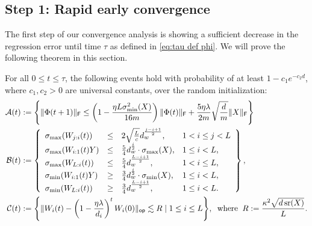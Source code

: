 \subsection{Step 1: Rapid early convergence}
\label{sec:subsec:Step 1: Rapid early convergence}
The first step of our convergence analysis is 
showing a sufficient decrease in the regression error until time $\tau$ as defined in \cref{eq:tau def phi}.
We will prove the following theorem in this section. 
\begin{theorem}
\label{thm:step1-induction}
    For all $0 \leq t \leq \tau$, the following events hold with probability of at least $1-c_1 e^{-c_2 d}$, where $c_1, c_2 > 0$ are
    universal constants, over the random initialization:
    \begin{subequations}
      \begin{align}
          \cA(t) &:= \set*{
              \frobnorm{\Phi(t+1)} \leq
              \left(1 - \frac{\eta L \sigma_{\min}^2(X)}{16 \din} \right)
              \frobnorm{\Phi(t)}
              + \frac{5 \eta \lambda}{2 \din} \sqrt{\frac{\dout}{\din}} \frobnorm{X}
          }
          \label{eq:event-A-prestop}
          \\
          \cB(t) &:= \left\{
          \begin{array}{lcll}
              \sigma_{\max}(W_{j:i}(t)) &\leq&
              2 \sqrt{\frac{L}{c}} \dhid^{\frac{j - i + 1}{2}}, &
              1 < i \leq j < L \\
              \sigma_{\max}(W_{i:1}(t) Y) &\leq&
              \frac{5}{4} \dhid^{\frac{i}{2}} \cdot \sigma_{\max}(X), &
              1 \leq i < L, \\
              \sigma_{\max}(W_{L:i}(t)) &\leq&
              \frac{5}{4} \dhid^{\frac{L - i + 1}{2}}, & 1 < i \leq L, \\
              \sigma_{\min}(W_{i:1}(t) Y) &\geq&
              \frac{3}{4} \dhid^{\frac{i}{2}} \cdot \sigma_{\min}(X), & 1 \leq i < L, \\
              \sigma_{\min}(W_{L:i}(t)) &\geq&
              \frac{3}{4} \dhid^{\frac{L - i + 1}{2}}, & 1 \leq i < L.
              \\
          \end{array} \right\},
          \label{eq:event-B-prestop}
          \\
          \cC(t) &:= \set*{
              \opnorm{W_{i}(t) - \left(
              1 - \frac{\eta \lambda}{d_i}
              \right)^t W_{i}(0)}
              \lesssim
              R
              \mid
              1 \leq i \leq L
          },
          \;\; \text{where} \;\;
          R := \frac{\kappa^2 \sqrt{d \sr(X)}}{L}.
          \label{eq:event-C-prestop}
      \end{align}
    \end{subequations}
\end{theorem}
